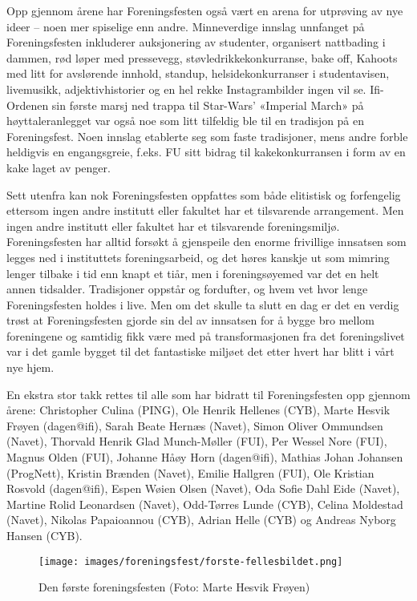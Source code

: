 Opp gjennom årene har Foreningsfesten også vært en arena for utprøving av nye ideer – noen mer spiselige enn andre. Minneverdige innslag unnfanget på Foreningsfesten inkluderer auksjonering av studenter, organisert nattbading i dammen, rød løper med pressevegg, støvledrikkekonkurranse, bake off, Kahoots med litt for avslørende innhold, standup, helsidekonkurranser i studentavisen, livemusikk, adjektivhistorier og en hel rekke Instagrambilder ingen vil se. Ifi-Ordenen sin første marsj ned trappa til Star-Wars' «Imperial March» på høyttaleranlegget var også noe som litt tilfeldig ble til en tradisjon på en Foreningsfest. Noen innslag etablerte seg som faste tradisjoner, mens andre forble heldigvis en engangsgreie, f.eks. FU sitt bidrag til kakekonkurransen i form av en kake laget av penger.

Sett utenfra kan nok Foreningsfesten oppfattes som både elitistisk og forfengelig ettersom ingen andre institutt eller fakultet har et tilsvarende arrangement. Men ingen andre institutt eller fakultet har et tilsvarende foreningsmiljø. Foreningsfesten har alltid forsøkt å gjenspeile den enorme frivillige innsatsen som legges ned i instituttets foreningsarbeid, og det høres kanskje ut som mimring lenger tilbake i tid enn knapt et tiår, men i foreningsøyemed var det en helt annen tidsalder. Tradisjoner oppstår og fordufter, og hvem vet hvor lenge Foreningsfesten holdes i live. Men om det skulle ta slutt en dag er det en verdig trøst at Foreningsfesten gjorde sin del av innsatsen for å bygge bro mellom foreningene og samtidig fikk være med på transformasjonen fra det foreningslivet var i det gamle bygget til det fantastiske miljøet det etter hvert har blitt i vårt nye hjem. 

En ekstra stor takk rettes til alle som har bidratt til Foreningsfesten opp gjennom årene: Christopher Culina (PING), Ole Henrik Hellenes (CYB), Marte Hesvik Frøyen (dagen@ifi), Sarah Beate Hernæs (Navet), Simon Oliver Ommundsen (Navet), Thorvald Henrik Glad Munch-Møller (FUI), Per Wessel Nore (FUI), Magnus Olden (FUI), Johanne Håøy Horn (dagen@ifi), Mathias Johan Johansen (ProgNett), Kristin Brænden (Navet), Emilie Hallgren (FUI), Ole Kristian Rosvold (dagen@ifi), Espen Wøien Olsen (Navet), Oda Sofie Dahl Eide (Navet), Martine Rolid Leonardsen (Navet), Odd-Tørres Lunde (CYB), Celina Moldestad (Navet), Nikolas Papaioannou (CYB), Adrian Helle (CYB) og Andreas Nyborg Hansen (CYB).

\begin{sidewaysfigure}
    \centering
    	\texttt{[image: images/foreningsfest/forste-fellesbildet.png]}
	\label{fig:forste-fellesbilde}
	\caption{Den første foreningsfesten (Foto: Marte Hesvik Frøyen)}
\end{sidewaysfigure}
